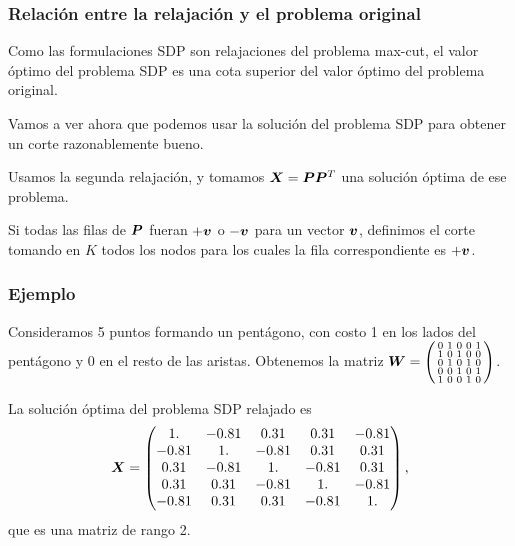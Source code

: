\documentclass[aspectratio=169,12pt,spanish]{beamer}
\begin{document}

\begin{frame}
\frametitle{Relación entre la relajación y el problema original}

Como las formulaciones SDP son relajaciones del problema max-cut, el valor óptimo del problema SDP es una cota superior del valor óptimo del problema original.

Vamos a ver ahora que podemos usar la solución del problema SDP para obtener un corte razonablemente bueno.

Usamos la segunda relajación, y tomamos $\bm{X} = \bm{P}\bm{P}^T$ una solución óptima de ese problema.

Si todas las filas de $\bm{P}$ fueran $+\bm{v}$ o $-\bm{v}$ para un vector $\bm{v}$, definimos el corte tomando en $K$ todos los nodos para los cuales la fila correspondiente es $+\bm{v}$.

\end{frame}


\begin{frame}
\frametitle{Ejemplo}

Consideramos 5 puntos formando un pentágono, con costo 1 en los lados del pentágono y 0 en el resto de las aristas. Obtenemos la matriz
$
\bm{W}= \left(\begin{smallmatrix}
0 & 1 & 0 & 0 & 1 \\
1 & 0 & 1 & 0 & 0 \\
0 & 1 & 0 & 1 & 0 \\
0 & 0 & 1 & 0 & 1 \\
1 & 0 & 0 & 1 & 0
\end{smallmatrix}\right)
$.

La solución óptima del problema SDP relajado es
$$
\bm{X}= \begin{pmatrix}
 1.   & -0.81 &  0.31 &  0.31 & -0.81 \\
-0.81 &  1.   & -0.81 &  0.31 &  0.31 \\
 0.31 & -0.81 &  1.   & -0.81 &  0.31 \\
 0.31 &  0.31 & -0.81 &  1.   & -0.81 \\
-0.81 &  0.31 &  0.31 & -0.81 &  1.   \\
\end{pmatrix},
$$
que es una matriz de rango 2.

\end{frame}
\end{document}
